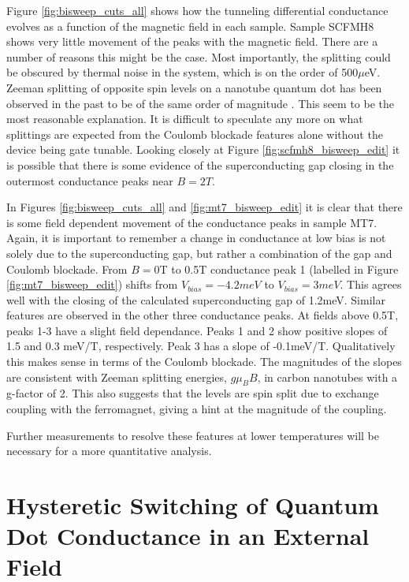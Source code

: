 Figure \ref{fig:bisweep_cuts_all} shows how the tunneling differential conductance evolves as a function of the magnetic field in each sample. Sample SCFMH8 shows very little movement of the peaks with the magnetic field. There are a number of reasons this might be the case. Most importantly, the splitting could be obscured by thermal noise in the system, which is on the order of 500$\mu$eV. Zeeman splitting of opposite spin levels on a nanotube quantum dot has been observed in the past to be of the same order of magnitude \cite{Tans1997}. This seem to be the most reasonable explanation. It is difficult to speculate any more on what splittings are expected from the Coulomb blockade features alone without the device being gate tunable. Looking closely at Figure \ref{fig:scfmh8_bisweep_edit} it is possible that there is some evidence of the superconducting gap closing in the outermost conductance peaks near $B=2T$.

In Figures \ref{fig:bisweep_cuts_all} and \ref{fig:mt7_bisweep_edit} it is clear that there is some field dependent movement of the conductance peaks in sample MT7. Again, it is important to remember a change in conductance at low bias is not solely due to the superconducting gap, but rather a combination of the gap and Coulomb blockade. From $B=0$T to 0.5T conductance peak 1 (labelled in Figure \ref{fig:mt7_bisweep_edit}) shifts from $V_{bias}=-4.2meV$ to $V_{bias}=3meV$. This agrees well with the closing of the calculated superconducting gap of 1.2meV. Similar features are observed in the other three conductance peaks. At fields above 0.5T, peaks 1-3 have a slight field dependance. Peaks 1 and 2 show positive slopes of 1.5 and 0.3 meV/T, respectively. Peak 3 has a slope of -0.1meV/T. Qualitatively this makes sense in terms of the Coulomb blockade. The magnitudes of the slopes are consistent with Zeeman splitting energies, $g \mu_B B$, in carbon nanotubes with a g-factor of 2. This also suggests that the levels are spin split due to exchange coupling with the ferromagnet, giving a hint at the magnitude of the coupling.

Further measurements to resolve these features at lower temperatures will be necessary for a more quantitative analysis.

\section{Hysteretic Switching of Quantum Dot Conductance in an External Field}
\label{sec:scfm_switching}


